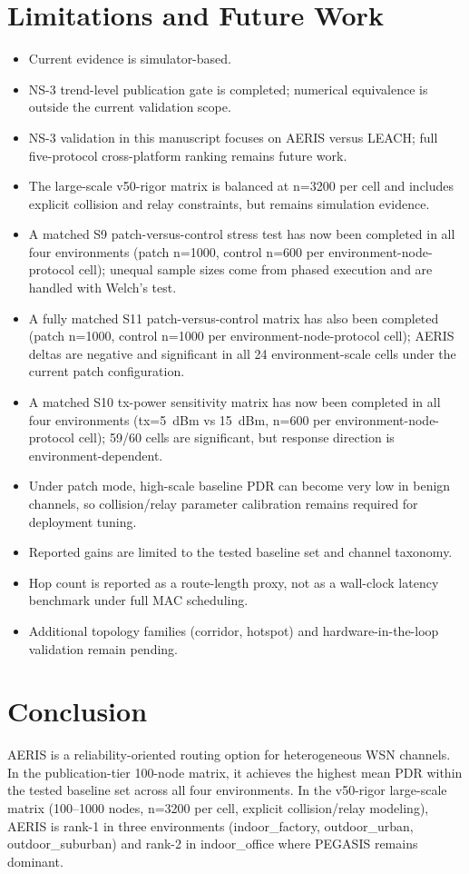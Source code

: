 ﻿\documentclass[sensors,article,submit,moreauthors,pdftex]{Definitions/mdpi}
\begin{document}
\section{Limitations and Future Work}
\begin{itemize}
\item Current evidence is simulator-based.
\item NS-3 trend-level publication gate is completed; numerical equivalence is outside the current validation scope.
\item NS-3 validation in this manuscript focuses on AERIS versus LEACH; full five-protocol cross-platform ranking remains future work.
\item The large-scale v50-rigor matrix is balanced at n=3200 per cell and includes explicit collision and relay constraints, but remains simulation evidence.
\item A matched S9 patch-versus-control stress test has now been completed in all four environments (patch n=1000, control n=600 per environment-node-protocol cell); unequal sample sizes come from phased execution and are handled with Welch's test.
\item A fully matched S11 patch-versus-control matrix has also been completed (patch n=1000, control n=1000 per environment-node-protocol cell); AERIS deltas are negative and significant in all 24 environment-scale cells under the current patch configuration.
\item A matched S10 tx-power sensitivity matrix has now been completed in all four environments (tx=\SI{5}{dBm} vs \SI{15}{dBm}, n=600 per environment-node-protocol cell); 59/60 cells are significant, but response direction is environment-dependent.
\item Under patch mode, high-scale baseline PDR can become very low in benign channels, so collision/relay parameter calibration remains required for deployment tuning.
\item Reported gains are limited to the tested baseline set and channel taxonomy.
\item Hop count is reported as a route-length proxy, not as a wall-clock latency benchmark under full MAC scheduling.
\item Additional topology families (corridor, hotspot) and hardware-in-the-loop validation remain pending.
\end{itemize}

\section{Conclusion}
AERIS is a reliability-oriented routing option for heterogeneous WSN channels. In the publication-tier 100-node matrix, it achieves the highest mean PDR within the tested baseline set across all four environments. In the v50-rigor large-scale matrix (100--1000 nodes, n=3200 per cell, explicit collision/relay modeling), AERIS is rank-1 in three environments (indoor\_factory, outdoor\_urban, outdoor\_suburban) and rank-2 in indoor\_office where PEGASIS remains dominant.
\end{document}
